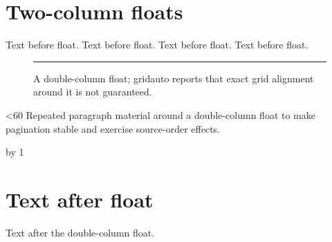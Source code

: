 \documentclass[twocolumn]{article}
\begin{document}
\section{Two-column floats}
Text before float. Text before float. Text before float. Text before float.
\begin{figure}[t]
\centering\rule{.7\textwidth}{2cm}
\caption{A double-column float; gridauto reports that exact grid alignment around it is not guaranteed.}
\end{figure}
\newcount\n {}
\loop\ifnum\n<60
Repeated paragraph material around a double-column float to make pagination stable and exercise source-order effects.\par
\advance\n by 1
\repeat
\section{Text after float}
Text after the double-column float.
\end{document}
